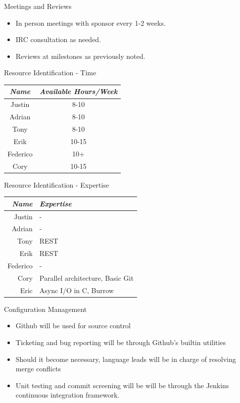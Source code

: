 \documentclass{beamer}
\begin{document}
\begin{frame}{Meetings and Reviews}
  \begin{itemize}
  \item In person meetings with sponsor every 1-2 weeks.
  \item IRC consultation as needed.
  \item Reviews at milestones as previously noted.
  \end{itemize}
\end{frame}

\begin{frame}{Resource Identification - Time}
  \begin{center}
    \begin{tabular}{|c|c|}
      \hline
      \emph{Name} & \emph{Available Hours/Week}\\ \hline \hline
      Justin & 8-10\\ \hline
      Adrian & 8-10\\ \hline
      Tony & 8-10\\ \hline
      Erik & 10-15\\ \hline
      Federico & 10+\\ \hline
      Cory & 10-15 \\
      \hline
    \end{tabular}
  \end{center}
\end{frame}

\begin{frame}{Resource Identification - Expertise}
  \begin{center}
    \begin{tabular}{|r|l|}
      \hline
      \emph{Name} & \emph{Expertise}\\ \hline \hline
      Justin & -\\ \hline
      Adrian & -\\ \hline
      Tony & REST \\ \hline
      Erik & REST \\ \hline
      Federico & -\\ \hline
      Cory & Parallel architecture, Basic Git \\ \hline
      Eric & Async I/O in C, Burrow\\
      \hline
    \end{tabular}
  \end{center}
\end{frame}

\begin{frame}{Configuration Management}
  \begin{itemize}
  \item Github will be used for source control
  \item Ticketing and bug reporting will be through Github's builtin utilities
  \item Should it become necessary, language leads will be in charge of resolving merge conflicts
  \item Unit testing and commit screening will be will be through the Jenkins continuous integration framework.
  \end{itemize}
\end{frame}
\end{document}
